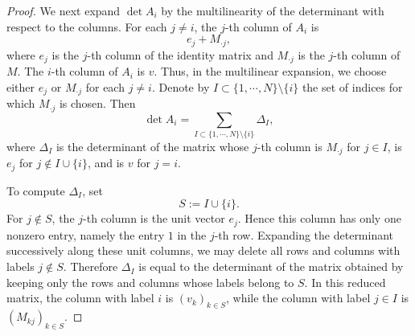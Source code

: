 \documentclass[11pt]{article}
\numberwithin{equation}{section}
\theoremstyle{definition}
\begin{document}
\begin{proof}
We next expand \(\det A_i\) by the multilinearity of the determinant with
respect to the columns. For each \(j\neq i\), the \(j\)-th column of \(A_i\)
is
\[
e_j+M_{\cdot j},
\]
where \(e_j\) is the \(j\)-th column of the identity matrix and
\(M_{\cdot j}\) is the \(j\)-th column of \(M\). The \(i\)-th column of
\(A_i\) is \(v\). Thus, in the multilinear expansion,
we choose either \(e_j\) or \(M_{\cdot j}\) for each \(j\neq i\). Denote by
\(I\subset\{1,\cdots,N\}\setminus\{i\}\) the set of indices for which
\(M_{\cdot j}\) is chosen. Then
\begin{equation}\label{eq:Ai-expansion}
	\det A_i
	=
	\sum_{I\subset\{1,\cdots,N\}\setminus\{i\}} \Delta_I,
\end{equation}
where \(\Delta_I\) is the determinant of the matrix whose \(j\)-th column is
\(M_{\cdot j}\) for \(j\in I\), is \(e_j\) for
\(j\notin I\cup\{i\}\), and is \(v\) for \(j=i\).

To compute \(\Delta_I\), set
\[
S:=I\cup\{i\}.
\]
For \(j\notin S\), the \(j\)-th column is the unit vector \(e_j\). Hence this column has only one nonzero entry, namely the entry \(1\) in the \(j\)-th row. Expanding the determinant successively along these unit columns, we may delete all rows and columns with labels \(j\notin S\). Therefore \(\Delta_I\) is equal to the determinant of the matrix obtained by keeping only the rows and columns whose labels belong to \(S\). In this reduced matrix, the column with label \(i\) is \((v_k)_{k\in S}\), while the column with label \(j\in I\) is \((M_{kj})_{k\in S}\).


\end{proof}
\end{document}
